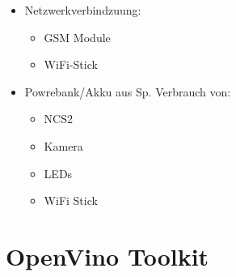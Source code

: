 

\begin{itemize}
    \item Netzwerkverbindzuung:
    \begin{itemize}
        \item GSM Module
        \item WiFi-Stick
    \end{itemize}
    \item Powrebank/Akku aus Sp. Verbrauch von:
    \begin{itemize}
        \item NCS2
        \item Kamera
        \item LEDs
        \item WiFi Stick
    \end{itemize}
\end{itemize}






\section{OpenVino Toolkit}\label{sec:openvino}


